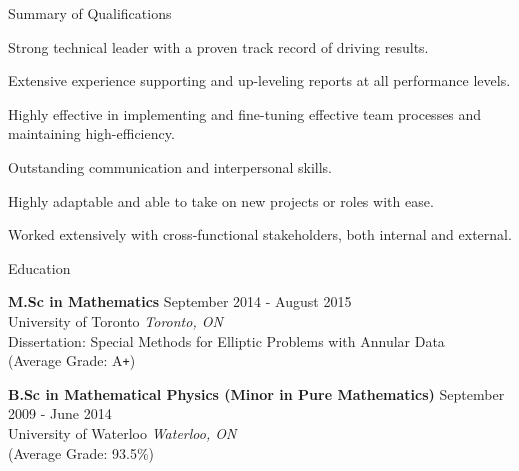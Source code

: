 \documentclass{resume} %
\begin{document}

\begin{rSection}{Summary of Qualifications}

\begin{rSubsection}{}{}{}{}
\item Strong technical leader with a proven track record of driving results.
\item Extensive experience supporting and up-leveling reports at all performance levels.
\item Highly effective in implementing and fine-tuning effective team processes and maintaining high-efficiency.
\item Outstanding communication and interpersonal skills.
\item Highly adaptable and able to take on new projects or roles with ease.
\item Worked extensively with cross-functional stakeholders, both internal and external.
\end{rSubsection}

\end{rSection}


\begin{rSection}{Education}

\textbf{M.Sc in Mathematics} \hfill {September 2014 - August 2015} \\ 
University of Toronto  \hfill {\textit{Toronto, ON}} \\
Dissertation: Special Methods for Elliptic Problems with Annular Data \\
(Average Grade: A\verb!+!)

\textbf{B.Sc in Mathematical Physics (Minor in Pure Mathematics)} \hfill {September 2009 - June 2014} \\ 
University of Waterloo \hfill {\textit{Waterloo, ON}} \\
(Average Grade: 93.5\%)

\end{rSection}

\end{document}
